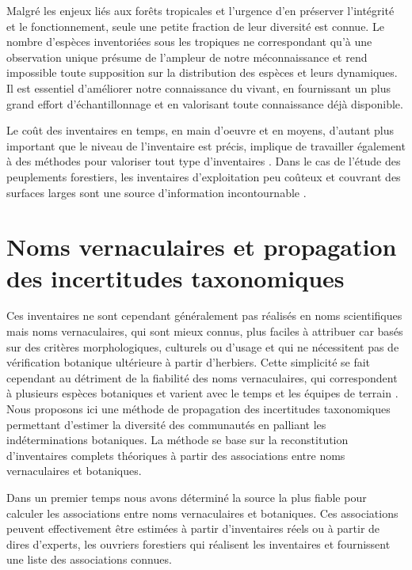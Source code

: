 \documentclass[
  11pt,
  french,
  A4paper,
  extrafontsizes,onecolumn,openright
  ]{memoir}
\begin{document}
Malgré les enjeux liés aux forêts tropicales et l'urgence d'en préserver
l'intégrité et le fonctionnement, seule une petite fraction de leur
diversité est connue. Le nombre d'espèces inventoriées sous les
tropiques ne correspondant qu'à une observation unique
\autocite{Feeley2011} présume de l'ampleur de notre méconnaissance et
rend impossible toute supposition sur la distribution des espèces et
leurs dynamiques. Il est essentiel d'améliorer notre connaissance du
vivant, en fournissant un plus grand effort d'échantillonnage et en
valorisant toute connaissance déjà disponible.

Le coût des inventaires en temps, en main d'oeuvre et en moyens,
d'autant plus important que le niveau de l'inventaire est précis,
implique de travailler également à des méthodes pour valoriser tout type
d'inventaires \autocite{Baraloto2012}. Dans le cas de l'étude des
peuplements forestiers, les inventaires d'exploitation peu coûteux et
couvrant des surfaces larges sont une source d'information
incontournable \autocites{terSteege2000}{Guitet2014}.

\section{Noms vernaculaires et propagation des incertitudes
taxonomiques}\label{noms-vernaculaires-et-propagation-des-incertitudes-taxonomiques}

Ces inventaires ne sont cependant généralement pas réalisés en noms
scientifiques mais noms vernaculaires, qui sont mieux connus, plus
faciles à attribuer car basés sur des critères morphologiques, culturels
ou d'usage et qui ne nécessitent pas de vérification botanique
ultérieure à partir d'herbiers. Cette simplicité se fait cependant au
détriment de la fiabilité des noms vernaculaires, qui correspondent à
plusieurs espèces botaniques et varient avec le temps et les équipes de
terrain \autocite{Oldeman1968}. Nous proposons ici une méthode de
propagation des incertitudes taxonomiques permettant d'estimer la
diversité des communautés en palliant les indéterminations botaniques.
La méthode se base sur la reconstitution d'inventaires complets
théoriques à partir des associations entre noms vernaculaires et
botaniques.

Dans un premier temps nous avons déterminé la source la plus fiable pour
calculer les associations entre noms vernaculaires et botaniques. Ces
associations peuvent effectivement être estimées à partir d'inventaires
réels ou à partir de dires d'experts, les ouvriers forestiers qui
réalisent les inventaires et fournissent une liste des associations
connues.
\end{document}
